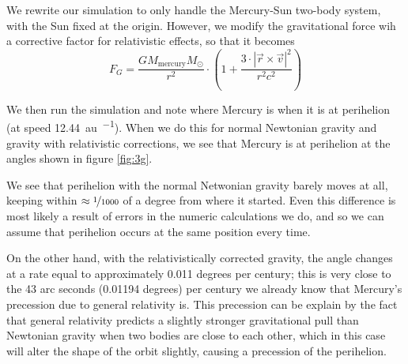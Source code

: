 \documentclass[11pt,a4paper]{article}
\def\sun{\odot}
\begin{document}
We rewrite our simulation to only handle the Mercury-Sun two-body system, with the Sun fixed at the origin. However,
we modify the gravitational force wih a corrective factor for relativistic effects, so that it becomes
\begin{equation}
  F_G = \frac{G M_{\mathrm{mercury}} M_\sun}{r^2} \cdot \left( 1 + \frac{3 \cdot |\vec{r} \times \vec{v}|^2}{r^2 c^2} \right)
\end{equation}

We then run the simulation and note where Mercury is when it is at perihelion (at speed \SI{12.44}{\astronomicalunit . \year^{-1}}).
When we do this for normal Newtonian gravity and gravity with relativistic corrections, we see that Mercury is at perihelion at the
angles shown in figure \ref{fig:3g}.

We see that perihelion with the normal Netwonian gravity barely moves at all, keeping within $\approx \nicefrac{1}{1000}$ of a degree from where it started.
Even this difference is most likely a result of errors in the numeric calculations we do, and so we can assume that perihelion occurs at the same position every time.

On the other hand, with the relativistically corrected gravity, the angle changes at a rate equal to approximately 0.011 degrees per century; this is very close to
the 43 arc seconds (0.01194 degrees) per century we already know that Mercury's precession due to general relativity is. This precession can be explain by the fact that general relativity predicts a
slightly stronger gravitational pull than Newtonian gravity when two bodies are close to each other, which in this case will alter the shape of the orbit slightly, causing a precession of the perihelion.
\end{document}
